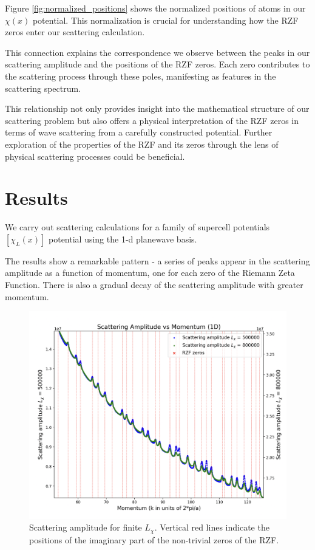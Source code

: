 \documentclass[11pt, oneside]{article}
\begin{document}
Figure \ref{fig:normalized_positions} shows the normalized positions of atoms in our $\chi(x)$ potential. This normalization is crucial for understanding how the RZF zeros enter our scattering calculation.

This connection explains the correspondence we observe between the peaks in our scattering amplitude and the positions of the RZF zeros. Each zero contributes to the scattering process through these poles, manifesting as features in the scattering spectrum.

This relationship not only provides insight into the mathematical structure of our scattering problem but also offers a physical interpretation of the RZF zeros in terms of wave scattering from a carefully constructed potential. Further exploration of the properties of the RZF and its zeros through the lens of physical scattering processes could be beneficial.

\section{Results}
We carry out scattering calculations for a family of supercell potentials $[\chi_L(x)]$ potential using the 1-d planewave basis.

The results show a remarkable pattern - a series of peaks appear in the scattering amplitude as a function of momentum, one for each zero of the Riemann Zeta Function. 
There is also a gradual decay of the scattering amplitude with greater momentum.
\begin{figure}[htbp]
\begin{center}
    \includegraphics[width=0.8\linewidth]{zoomed_scattering.png}
\caption{Scattering amplitude for finite $L_{\chi}$. Vertical red lines indicate the positions of the imaginary part of the non-trivial zeros of the RZF.}
\label{fig:scattering_amplitude}
\end{center}
\end{figure}
\end{document}

